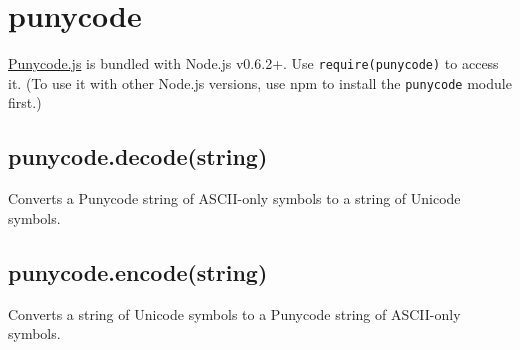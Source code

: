 \section{punycode}\label{punycode}

\begin{Shaded}
\begin{Highlighting}[]
 
\end{Highlighting}
\end{Shaded}

\href{http://mths.be/punycode}{Punycode.js} is bundled with Node.js
v0.6.2+. Use
\texttt{require(\textquotesingle{}punycode\textquotesingle{})} to access
it. (To use it with other Node.js versions, use npm to install the
\texttt{punycode} module first.)

\subsection{punycode.decode(string)}\label{punycode.decodestring}

Converts a Punycode string of ASCII-only symbols to a string of Unicode
symbols.

\begin{Shaded}
\begin{Highlighting}[]
\NormalTok{(}\NormalTok{); }
\NormalTok{(}\NormalTok{); }
\end{Highlighting}
\end{Shaded}

\subsection{punycode.encode(string)}\label{punycode.encodestring}

Converts a string of Unicode symbols to a Punycode string of ASCII-only
symbols.

\begin{Shaded}
\begin{Highlighting}[]
\NormalTok{(}\NormalTok{); }
\NormalTok{(}\NormalTok{); }
\end{Highlighting}
\end{Shaded}

